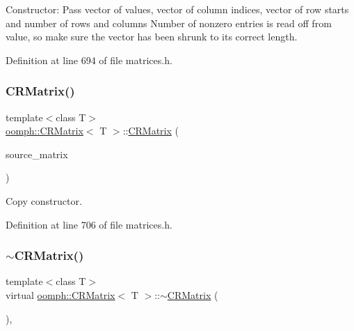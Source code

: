 Constructor\+: Pass vector of values, vector of column indices, vector of row starts and number of rows and columns Number of nonzero entries is read off from value, so make sure the vector has been shrunk to its correct length. 



Definition at line 694 of file matrices.\+h.

\mbox{\label{classoomph_1_1CRMatrix_a27b5182b560fd414bde62baf6fe7f519}} 
\subsubsection{\texorpdfstring{C\+R\+Matrix()}{CRMatrix()}\hspace{0.1cm}{\footnotesize\ttfamily [3/3]}}
{\footnotesize\ttfamily template$<$class T$>$ \\
\hyperlink{classoomph_1_1CRMatrix}{oomph\+::\+C\+R\+Matrix}$<$ T $>$\+::\hyperlink{classoomph_1_1CRMatrix}{C\+R\+Matrix} (\begin{DoxyParamCaption}\item[{const \hyperlink{classoomph_1_1CRMatrix}{C\+R\+Matrix}$<$ T $>$ \&}]{source\+\_\+matrix }\end{DoxyParamCaption})\hspace{0.3cm}{\ttfamily [inline]}}



Copy constructor. 



Definition at line 706 of file matrices.\+h.

\mbox{\label{classoomph_1_1CRMatrix_ae0f73d8120305af7a20f6f7b64af0547}} 
\subsubsection{\texorpdfstring{$\sim$\+C\+R\+Matrix()}{~CRMatrix()}}
{\footnotesize\ttfamily template$<$class T$>$ \\
virtual \hyperlink{classoomph_1_1CRMatrix}{oomph\+::\+C\+R\+Matrix}$<$ T $>$\+::$\sim$\hyperlink{classoomph_1_1CRMatrix}{C\+R\+Matrix} (\begin{DoxyParamCaption}{ }\end{DoxyParamCaption})\hspace{0.3cm}{\ttfamily [inline]}, {\ttfamily [virtual]}}



